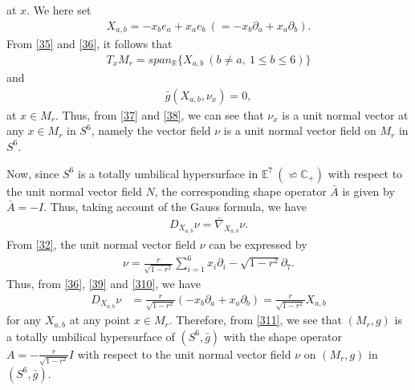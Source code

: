 \documentclass[12pt]{article}
\numberwithin{equation}{section}
\begin{document}
at $x$. We here set
\begin{equation}\label{36}
\begin{split}
X_{a,b}=-x_{b}e_{a}+x_{a}e_{b}~(=-x_{b}\partial_{a}+x_{a}\partial_{b}).
\end{split}
\end{equation}
From \eqref{35} and \eqref{36}, it follows that
\begin{equation}\label{37}
\begin{split}
T_{x}M_{r}=span_{\mathbb{R}}\{X_{a,b}~(b\neq a,~1\leq b \leq 6)\}
\end{split}
\end{equation}
and
\begin{equation}\label{38}
\begin{split}
\bar{g}(X_{a,b},\nu_{x})=0,
\end{split}
\end{equation}
at $x \in M_{r}$. Thus, from \eqref{37} and \eqref{38}, we can see that $\nu_{x}$ is a unit normal vector at any $x \in M_{r}$ in $S^{6}$, namely the vector field $\nu$ is a unit normal vector field on $M_{r}$ in $S^{6}$.

Now, since $S^{6}$ is a totally umbilical hypersurface in
$\mathbb{E}^{7}~(\backsimeq \mathbb{C}_{+})$ with respect to the
unit normal vector field $N$, the corresponding shape operator $\bar{A}$ is
given by $\bar{A}=-I$. Thus, taking account of the Gauss formula, we
have
\begin{equation}\label{39}
\begin{split}
D_{X_{a,b}}\nu=\bar{\nabla}_{X_{a,b}}\nu.
\end{split}
\end{equation}
From \eqref{32}, the unit normal vector field $\nu$ can be expressed by
\begin{equation}\label{310}
\begin{split}
\nu=\frac{r}{\sqrt{1-r^{2}}}\sum_{i=1}^{6} x_{i}\partial_{i} -\sqrt{1-r^{2}}\partial_{7}.
\end{split}
\end{equation}
Thus, from \eqref{36}, \eqref{39} and \eqref{310}, we have
\begin{equation}\label{311}
\begin{split}
D_{X_{a,b}}\nu&=\frac{r}{\sqrt{1-r^{2}}}(-x_{b}\partial_{a}+x_{a}\partial_{b})=\frac{r}{\sqrt{1-r^{2}}}X_{a,b}
\end{split}
\end{equation}
for any $X_{a,b}$ at any point $x \in M_{r}$. Therefore, from \eqref{311}, we see that $(M_{r},g)$ is a totally umbilical hypersurface of $(S^{6},\bar{g})$ with the shape operator $A=-\frac{r}{\sqrt{1-r^{2}}}I$ with respect to the unit normal vector field $\nu$ on $(M_{r},g)$ in $(S^{6},\bar{g})$.
\end{document}
